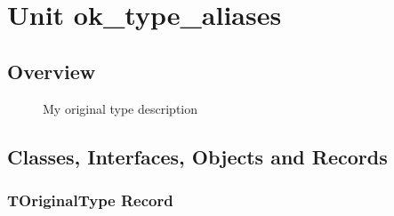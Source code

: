 \documentclass{report}
\newif\ifpdf
\begin{document}
\label{toc}\tableofcontents
\newpage
\newlength{\tmplength}
\chapter{Unit ok{\_}type{\_}aliases}
\label{ok_type_aliases}
\section{Overview}
\begin{description}
\item[\texttt{\begin{ttfamily}TOriginalType\end{ttfamily} Record}]My original type description
\end{description}
\section{Classes, Interfaces, Objects and Records}
\ifpdf
\subsection*{\large{\textbf{TOriginalType Record}}\normalsize\hspace{1ex}\hrulefill}
\else
\subsection*{TOriginalType Record}
\fi
\label{ok_type_aliases.TOriginalType}
\end{document}
